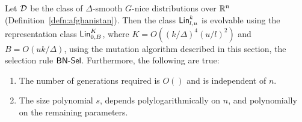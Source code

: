 \begin{theorem} Let ${\mathcal D}$ be the class of $\Delta$-smooth $G$-nice
distributions over $\mathbb{R}^n$ (Definition~\ref{defn:afghanistan}). Then the class
$\mathsf{Lin}^k_{l, u}$ is evolvable using the representation class $\mathsf{Lin}^K_{0, B}$,
where $K = O((k/\Delta)^4 (u/l)^2)$ and $B = O(uk/\Delta)$, using the mutation
algorithm described in this section, the selection rule $\mathsf{BN\mbox{-}Sel}$.
Furthermore, the following are true:
\begin{enumerate}
\item The number of generations required is $O()$ and is independent of $n$. 
\item The size polynomial $s$, depends polylogarithmically on $n$, and
polynomially on the remaining parameters. 
\end{enumerate}
\label{thm:sparse_linear} \end{theorem}
